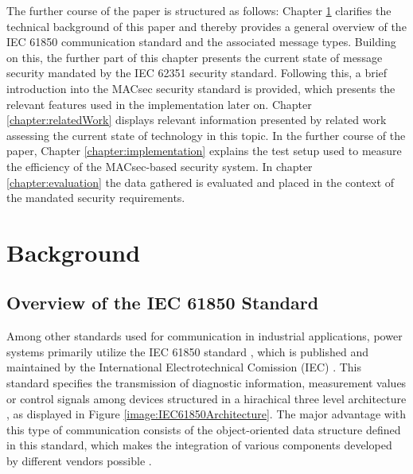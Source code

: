\documentclass[conference, onecolumn, a4paper]{IEEEtran}
\begin{document}
\smallskip
The further course of the paper is structured as follows: Chapter \ref{chapter:fundamentals} clarifies the technical background of this paper and thereby 
provides a general overview of the IEC 61850 communication standard and the associated  message types. Building on this, the further part of this chapter 
presents the current state of message security mandated by the IEC 62351 security standard. Following this, a brief introduction into the MACsec security 
standard is provided, which presents the relevant features used in the implementation later on. Chapter \ref{chapter:relatedWork} displays relevant 
information presented by related work assessing the current state of technology in this topic. In the further course of the paper, Chapter 
\ref{chapter:implementation} explains the test setup used to measure the efficiency of the MACsec-based security system. In chapter \ref{chapter:evaluation} 
the data gathered is evaluated and placed in the context of the mandated security requirements. 

\section{Background}
\label{chapter:fundamentals}

\subsection{Overview of the IEC 61850 Standard}
\label{subchapter:IEC61850}
Among other standards used for communication in industrial applications, power systems primarily utilize the IEC 61850 standard \cite{IEC61850:2023}, 
which is published and maintained by the International Electrotechnical Comission (IEC) \cite{IEC61850_Overview:2006}. This standard specifies the 
transmission of diagnostic information, measurement values or control signals among devices structured in a hirachical three level architecture 
\cite{SGRWin_IEC61850Architecture:2021}, as displayed in Figure \ref{image:IEC61850Architecture}. The major advantage with this type of communication consists 
of the object-oriented data structure defined in this standard, which makes the integration of various components developed by different vendors possible 
\cite[p. 5643]{Review_IEC62351:2019}. 
\end{document}
